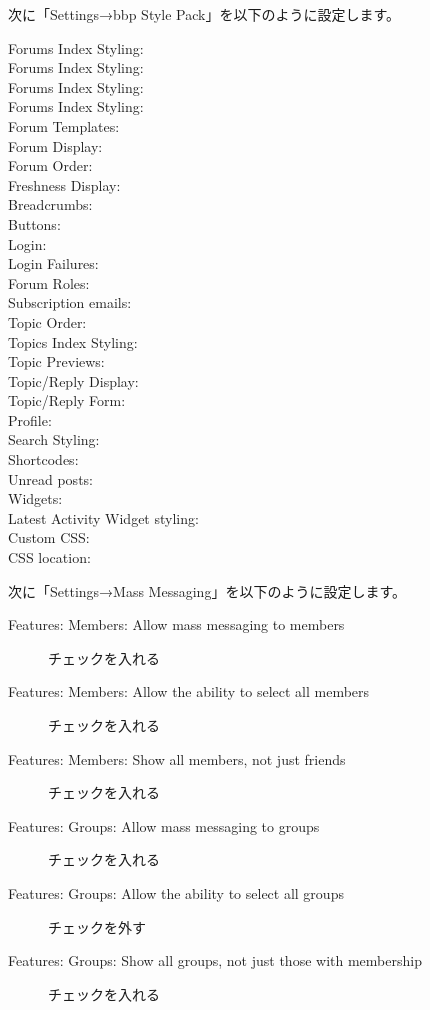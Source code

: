 \documentclass[titlepage,10pt,a4paper,uplatex]{jsbook}
\begin{document}
次に「Settings→bbp Style Pack」を以下のように設定します。

\begin{description}
\item[Forums Index Styling: ] 
\item[Forums Index Styling: ] 
\item[Forums Index Styling: ] 
\item[Forums Index Styling: ] 
\item[Forum Templates: ] 
\item[Forum Display: ] 
\item[Forum Order: ] 
\item[Freshness Display: ] 
\item[Breadcrumbs: ] 
\item[Buttons: ] 
\item[Login: ] 
\item[Login Failures: ] 
\item[Forum Roles: ] 
\item[Subscription emails: ] 
\item[Topic Order: ] 
\item[Topics Index Styling: ] 
\item[Topic Previews: ] 
\item[Topic/Reply Display: ] 
\item[Topic/Reply Form: ] 
\item[Profile: ] 
\item[Search Styling: ] 
\item[Shortcodes: ] 
\item[Unread posts: ] 
\item[Widgets: ] 
\item[Latest Activity Widget styling: ] 
\item[Custom CSS: ] 
\item[CSS location: ] 
\end{description}

次に「Settings→Mass Messaging」を以下のように設定します。

\begin{description}
\item[Features: Members: Allow mass messaging to members] チェックを入れる
\item[Features: Members: Allow the ability to select all members] チェックを入れる
\item[Features: Members: Show all members, not just friends] チェックを入れる
\item[Features: Groups: Allow mass messaging to groups] チェックを入れる
\item[Features: Groups: Allow the ability to select all groups] チェックを外す
\item[Features: Groups: Show all groups, not just those with membership] チェックを入れる
\end{description}
\end{document}
